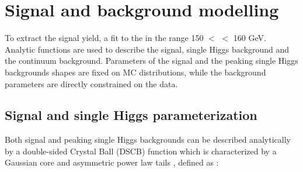 \section{Signal and background modelling}
\label{HHyybb:Modelling}

To extract the \HHyybb signal yield, a fit to the \myy in the range 150 $<$ \myy $<$ 160 GeV. Analytic functions are used to describe the signal, single Higgs background and the continuum background. Parameters of the signal and the peaking single Higgs backgrounds shapes are fixed on MC distributions, while the background parameters are directly constrained on the data.   

\subsection{Signal and single Higgs parameterization}
\label{HHyybb:Modelling:Sig}

Both signal and peaking single Higgs backgrounds can be described analytically by a double-sided Crystal Ball (DSCB) function which is characterized by a Gaussian core and asymmetric power law tails \cite{Higgs_2018}, defined as :

